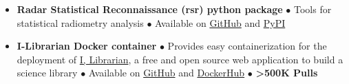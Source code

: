 \begin{itemize}[leftmargin=*]
    \item
    \textbf{Radar Statistical Reconnaissance (rsr) python package} $\bullet$ Tools for statistical radiometry analysis $\bullet$ Available on \href{https://github.com/cgrima/rsr}{GitHub} and \href{https://pypi.org/project/rsr/}{PyPI}
    \vspace{-.5em}
    \item
    \textbf{I-Librarian Docker container} $\bullet$ Provides easy containerization for the deployment of \href{https://i-librarian.net/}{I, Librarian}, a free and open source web application to build a science library $\bullet$ Available on \href{https://github.com/cgrima/docker_i-librarian}{GitHub} and \href{https://hub.docker.com/r/cgrima/i-librarian}{DockerHub} $\bullet$ \textbf{>500K Pulls} 
\end{itemize}

